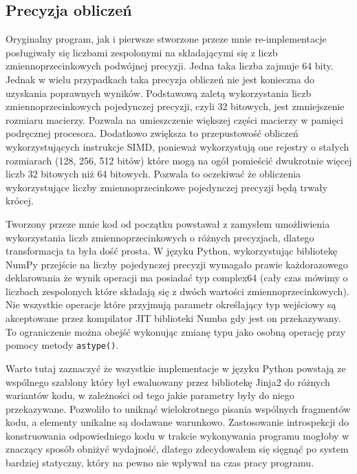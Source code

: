 \documentclass[11pt, a4paper]{article}
\newcommand{\code}[1]{\texttt{#1}}
\begin{document}
\begin{sloppypar}
    \subsection{Precyzja obliczeń}
    Oryginalny program, jak i pierwsze stworzone przeze mnie re-implementacje posługiwały
    się liczbami zespolonymi na składającymi się z liczb zmiennoprzecinkowych podwójnej precyzji.
    Jedna taka liczba zajmuje 64 bity. Jednak w wielu przypadkach taka precyzja obliczeń
    nie jest konieczna do uzyskania poprawnych wyników. Podstawową zaletą wykorzystania
    liczb zmiennoprzecinkowych pojedynczej precyzji, czyli 32 bitowych, jest
    zmniejszenie rozmiaru macierzy. Pozwala na umieszczenie większej części macierzy w pamięci
    podręcznej procesora. Dodatkowo zwiększa to przepustowość obliczeń wykorzystujących
    instrukcje SIMD, ponieważ wykorzystują one rejestry o stałych rozmiarach (128, 256,
    512 bitów) które mogą na ogół pomieścić dwukrotnie więcej liczb 32 bitowych niż 64 bitowych.
    Pozwala to oczekiwać że obliczenia wykorzystujące liczby zmiennoprzecinkowe
    pojedynczej precyzji będą trwały krócej.

    Tworzony przeze mnie kod od początku powstawał z zamysłem umożliwienia wykorzystania
    liczb zmiennoprzecinkowych o różnych precyzjach, dlatego transformacja ta była dość prosta.
    W języku Python, wykorzystując bibliotekę NumPy przejście na liczby pojedynczej precyzji
    wymagało prawie każdorazowego deklarowania że wynik operacji ma posiadać typ complex64
    (cały czas mówimy o liczbach zespolonych które składają się z dwóch wartości
    zmiennoprzecinkowych). Nie wszystkie operacje które przyjmują parametr określający
    typ wejściowy są akceptowane przez kompilator JIT biblioteki Numba gdy jest on
    przekazywany. To ograniczenie można obejść wykonując zmianę typu jako osobną operację
    przy pomocy metody \code{astype()}.

    Warto tutaj zaznaczyć że wszystkie implementacje w języku Python powstają ze
    wspólnego szablony który był ewaluowany przez bibliotekę Jinja2 do różnych wariantów
    kodu, w zależności od tego jakie parametry były do niego przekazywane. Pozwoliło to
    uniknąć wielokrotnego pisania wspólnych fragmentów kodu, a elementy unikalne są dodawane
    warunkowo. Zastosowanie introspekcji do konstruowania odpowiedniego kodu w trakcie
    wykonywania programu mogłoby w znaczący sposób obniżyć wydajność, dlatego zdecydowałem
    się sięgnąć po system bardziej statyczny, który na pewno nie wpływał na czas pracy
    programu.


\end{sloppypar}
\end{document}
